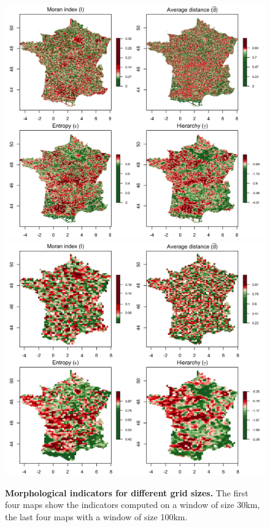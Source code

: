 \begin{figure}
	\includegraphics[width=\linewidth,height=0.48\textheight]{figuresraw/indics_morpho_en_areasize60_offset30_factor0_5.png}\\
	\includegraphics[width=\linewidth,height=0.48\textheight]{figuresraw/indics_morpho_en_areasize200_offset100_factor0_5.png}
	\caption{\textbf{Morphological indicators for different grid sizes.} The first four maps show the indicators computed on a window of size 30km, the last four maps with a window of size 100km.\label{fig:app:staticcorrelations:sensitivity-maps-morpho}}
\end{figure}



